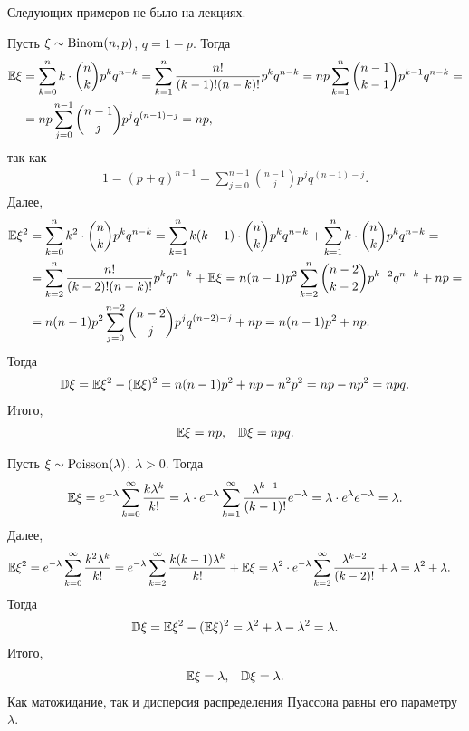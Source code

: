\documentclass[../main.tex]{subfiles}
\begin{document}
   Следующих примеров не было на лекциях.

   \begin{exmpl}
    Пусть $ \xi\sim\mathrm{Binom}(n,p) $, $ q = 1-p $. Тогда
    \begin{align*}
     \mathbb E\xi &= \sum_{k=0}^{n} k \cdot \binom n k p^{k} q^{n-k} = \sum_{k=1}^{n}\frac{n!}{(k-1)!(n-k)!}p^{k}q^{n-k} = np \sum_{k=1}^{n} \binom {n-1} {k-1} p^{k-1}q^{n-k} = \\
     &= np \sum_{j=0}^{n-1} \binom{n-1}j p^{j}q^{(n-1)-j} = np,
    \end{align*} так как
    \begin{align*}
     1 = (p+q)^{n-1} = \sum_{j=0}^{n-1} \binom{n-1} j p^{j}q^{(n-1)-j}.
    \end{align*} Далее,
    \begin{align*}
     \mathbb E\xi^{2} &= \sum_{k=0}^{n}k^{2} \cdot \binom n k p^{k}q^{n-k} = \sum_{k=1}^{n} k(k-1) \cdot \binom n k p^{k}q^{n-k} + \sum_{k=1}^{n} k \cdot \binom n k p^{k}q^{n-k} = \\
     &= \sum_{k=2}^{n} \frac{n!}{(k-2)!(n-k)!} p^{k}q^{n-k} + \mathbb E\xi = n(n-1)p^{2} \sum_{k=2}^{n} \binom{n-2}{k-2} p^{k-2}q^{n - k} + np = \\
     &= n(n-1)p^{2} \sum_{j=0}^{n-2}\binom{n-2}{j} p^{j} q^{(n-2)-j} + np = n(n-1)p^{2} + np.
    \end{align*} Тогда
    \begin{align*}
     \mathbb D\xi = \mathbb E\xi^{2} - (\mathbb E\xi)^{2} = n(n-1)p^{2} + np - n^{2}p^{2} = np - np^{2} = npq.
    \end{align*} Итого,
    \begin{align*}
     \mathbb E\xi = np, && \mathbb D\xi = npq.
    \end{align*}
   \end{exmpl}

   \begin{exmpl}
    Пусть $ \xi\sim\mathrm{Poisson}(\lambda) $,  $ \lambda > 0 $. Тогда
    \begin{align*}
     \mathbb E\xi =e^{-\lambda}  \sum_{k=0}^{\infty} \frac{k\lambda^{k}}{k!} = \lambda \cdot e^{-\lambda} \sum_{k=1}^{\infty} \frac{\lambda^{k-1}}{(k-1)!} e^{-\lambda} = \lambda \cdot e^{\lambda}e^{-\lambda} = \lambda.
    \end{align*} Далее,
    \begin{align*}
     \mathbb E\xi^{2} &= e^{-\lambda}\sum_{k=0}^{\infty}\frac{k^{2}\lambda^{k}}{k!} = e^{-\lambda} \sum_{k=2}^{\infty} \frac{k(k-1)\lambda^{k}}{k!} + \mathbb E\xi = \lambda^{2} \cdot e^{-\lambda} \sum_{k=2}^{\infty} \frac{\lambda^{k-2}}{(k-2)!} + \lambda = \lambda^{2}+\lambda.
    \end{align*} Тогда
    \begin{align*}
     \mathbb D\xi = \mathbb E\xi^{2} - (\mathbb E\xi)^{2} = \lambda^{2} + \lambda - \lambda^{2} = \lambda.
    \end{align*} Итого,
    \begin{align*}
     \mathbb E\xi = \lambda, && \mathbb D\xi = \lambda.
    \end{align*} Как матожидание, так и дисперсия распределения Пуассона равны его параметру $ \lambda $.
   \end{exmpl} 
\end{document}
